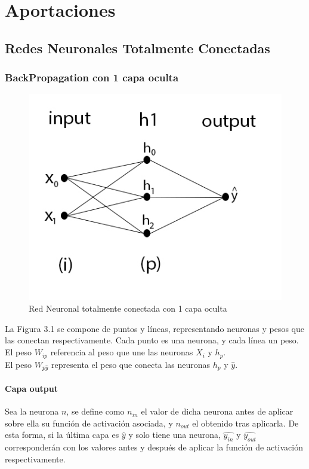 \chapter{Aportaciones}

\section{Redes Neuronales Totalmente Conectadas}
\subsection{BackPropagation con 1 capa oculta}

\begin{figure}[H]
	\centering
	\includegraphics[scale=0.35]{imagenes/nn_1_capa.jpg}  
	\caption{Red Neuronal totalmente conectada con 1 capa oculta}
	\label{fig:nn_1_capa}
\end{figure}

La Figura 3.1 se compone de puntos y líneas, representando neuronas y pesos que las conectan respectivamente. Cada punto es una neurona, y cada línea un peso. \\
El peso $W_{ip}$ referencia al peso que une las neuronas $X_i$ y $h_p$.\\
El peso $W_{p\hat{y}}$ representa el peso que conecta las neuronas $h_p$ y $\hat{y}$.


\subsubsection{Capa output}

Sea la neurona $n$, se define como $n_{in}$ el valor de dicha neurona antes de aplicar sobre ella su función de activación asociada, y $n_{out}$ el obtenido tras aplicarla.
De esta forma, si la última capa es $\hat{y}$ y solo tiene una neurona, $\hat{y_{in}}$ y $\hat{y_{out}}$ corresponderán con los valores antes y después de aplicar la función de activación respectivamente.\\

